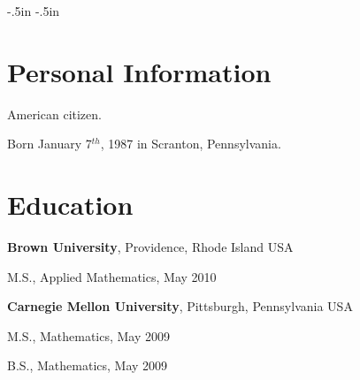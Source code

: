 


\oddsidemargin -.5in
\evensidemargin -.5in
\textwidth=6.0in
\itemsep=0in
\parsep=0in

\newenvironment{list1}{
  \begin{list}{\ding{113}}{%
      \setlength{\itemsep}{0in}
      \setlength{\parsep}{0in} \setlength{\parskip}{0in}
      \setlength{\topsep}{0in} \setlength{\partopsep}{0in} 
      \setlength{\leftmargin}{0.17in}}}{\end{list}}
\newenvironment{list2}{
  \begin{list}{$\bullet$}{%
      \setlength{\itemsep}{0in}
      \setlength{\parsep}{0in} \setlength{\parskip}{0in}
      \setlength{\topsep}{0in} \setlength{\partopsep}{0in} 
      \setlength{\leftmargin}{0.2in}}}{\end{list}}







\section*{\sc Personal Information}
\begin{list1}
    \item[] American citizen.
    \item[] Born January 7$^{th}$, 1987 in Scranton, Pennsylvania.
\end{list1}




\section*{\sc Education}

{\bf Brown University}, Providence, Rhode Island USA\\
\vspace*{-.1in}
\begin{list1}


\vspace*{.05in}
\item[] M.S., Applied Mathematics,  May 2010
\end{list1}


{\bf Carnegie Mellon University}, Pittsburgh, Pennsylvania USA\\
\vspace*{-.1in}
\begin{list1}
\item[] M.S., Mathematics,  May 2009
\item[] B.S., Mathematics, May 2009
\end{list1}
















